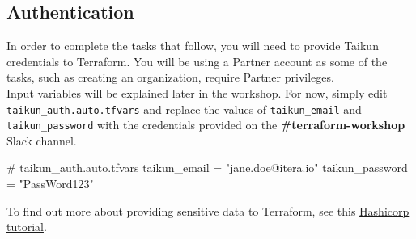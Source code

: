 \subsection{Authentication}\label{sec:auth}
In order to complete the tasks that follow, you will need to provide Taikun credentials to Terraform.
You will be using a Partner account as some of the tasks, such as creating an organization,
require Partner privileges.\\

Input variables will be explained later in the workshop.
For now, simply edit \texttt{taikun\_auth.auto.tfvars}
and replace the values of \texttt{taikun\_email} and \texttt{taikun\_password}
with the credentials provided on the \textbf{\#terraform-workshop} Slack channel.
\begin{tf}
# taikun_auth.auto.tfvars
taikun_email = "jane.doe@itera.io"
taikun_password = "PassWord123"
\end{tf}
To find out more about providing sensitive data to Terraform, see this \href{https://learn.hashicorp.com/tutorials/terraform/sensitive-variables}{Hashicorp tutorial}.
